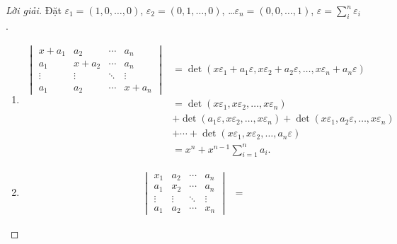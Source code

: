 \documentclass[class=nhvh-linear-algebra,crop=false]{standalone}
\begin{document}
\begin{proof}[Lời giải]
    \par Đặt $\varepsilon_{1} = (1, 0, \ldots, 0)$, $\varepsilon_{2} = (0, 1, \ldots, 0)$, \ldots $\varepsilon_{n} = (0, 0, \ldots, 1)$, $\varepsilon = \displaystyle\sum^{n}_{i}\varepsilon_{i}$.
    \begin{enumerate}[label = (\alph*)]
        \item
              \begin{align*}
                  \begin{vmatrix}
                      x + a_{1} & a_{2}     & \cdots & a_{n}     \\
                      a_{1}     & x + a_{2} & \cdots & a_{n}     \\
                      \vdots    & \vdots    & \ddots & \vdots    \\
                      a_{1}     & a_{2}     & \cdots & x + a_{n}
                  \end{vmatrix}
                   & = \det(x\varepsilon_{1} + a_{1}\varepsilon, x\varepsilon_{2} + a_{2}\varepsilon, \ldots, x\varepsilon_{n} + a_{n}\varepsilon)             \\
                   & = \det(x\varepsilon_{1}, x\varepsilon_{2}, \ldots, x\varepsilon_{n})                                                                      \\
                   & + \det(a_{1}\varepsilon, x\varepsilon_{2}, \ldots, x\varepsilon_{n}) + \det(x\varepsilon_{1}, a_{2}\varepsilon, \ldots, x\varepsilon_{n}) \\
                   & + \cdots + \det(x\varepsilon_{1}, x\varepsilon_{2}, \ldots, a_{n}\varepsilon)                                                             \\
                   & = x^{n} + x^{n-1}\sum^{n}_{i=1}a_{i}.
              \end{align*}
        \item
              \begin{align*}
                  \begin{vmatrix}
                      x_{1}  & a_{2}  & \cdots & a_{n}  \\
                      a_{1}  & x_{2}  & \cdots & a_{n}  \\
                      \vdots & \vdots & \ddots & \vdots \\
                      a_{1}  & a_{2}  & \cdots & x_{n}
                  \end{vmatrix}
                   & =

\end{align*}
\end{enumerate}
\end{proof}
\end{document}
